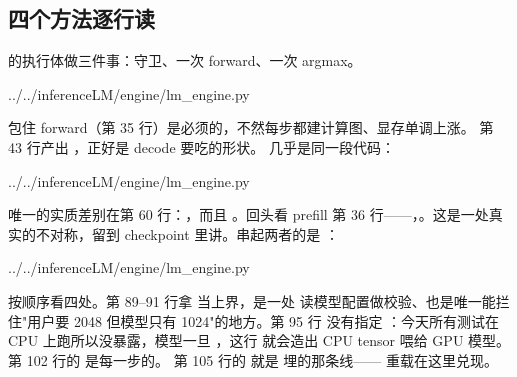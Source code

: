 \subsection{四个方法逐行读}
\label{sec:a-loop-four-methods}

 的执行体做三件事：守卫、一次 forward、一次 argmax。

%
  {../../inferenceLM/engine/lm_engine.py}

 包住 forward（第 35 行）是必须的，不然每步都建计算图、显存单调上涨。
第 43 行产出 ，正好是 decode 要吃的形状。 几乎是同一段代码：

%
  {../../inferenceLM/engine/lm_engine.py}

唯一的实质差别在第 60 行：，而且
。回头看 prefill 第 36 行——，。这是一处真实的不对称，留到 checkpoint 里讲。串起两者的是 ：

%
  {../../inferenceLM/engine/lm_engine.py}

按顺序看四处。第 89--91 行拿  当上界，是一处
 读模型配置做校验、也是唯一能拦住"用户要 2048 但模型只有 1024"的地方。第 95 行
没有指定 ：今天所有测试在 CPU 上跑所以没暴露，模型一旦 ，这行
就会造出 CPU tensor 喂给 GPU 模型。第 102 行的  是每一步的。
第 105 行的  就是
 埋的那条线—— 重载在这里兑现。

